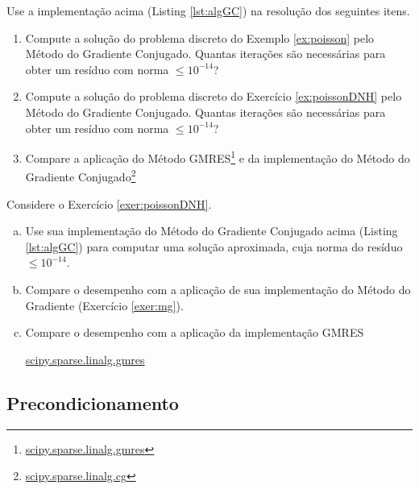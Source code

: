 \begin{exer}\label{exer:mgc}
  Use a implementação acima (Listing \ref{lst:algGC}) na resolução dos seguintes itens.
  \begin{enumerate}
  \item Compute a solução do problema discreto do Exemplo \ref{ex:poisson} pelo Método do Gradiente Conjugado. Quantas iterações são necessárias para obter um resíduo com norma $\leq 10^{-14}$?
  \item Compute a solução do problema discreto do Exercício \ref{ex:poissonDNH} pelo Método do Gradiente Conjugado. Quantas iterações são necessárias para obter um resíduo com norma $\leq 10^{-14}$?
  \item Compare a aplicação do Método GMRES\footnote{\href{https://docs.scipy.org/doc/scipy/reference/generated/scipy.sparse.linalg.gmres.html}{scipy.sparse.linalg.gmres}} e da implementação {\scipy} do Método do Gradiente Conjugado\footnote{\href{https://docs.scipy.org/doc/scipy/reference/generated/scipy.sparse.linalg.cg.html}{scipy.sparse.linalg.cg}}
  \end{enumerate}
\end{exer}

\begin{exer}
  Considere o Exercício \ref{exer:poissonDNH}.
  \begin{enumerate}[a)]
  \item Use sua implementação do Método do Gradiente Conjugado acima (Listing \ref{lst:algGC}) para computar uma solução aproximada, cuja norma do resíduo $\leq 10^{-14}$.
  \item Compare o desempenho com a aplicação de sua implementação do Método do Gradiente (Exercício \ref{exer:mg}).
  \item Compare o desempenho com a aplicação da implementação GMRES
    \begin{center}
      \href{https://docs.scipy.org/doc/scipy/reference/generated/scipy.sparse.linalg.gmres.html}{scipy.sparse.linalg.gmres}
    \end{center}
  \end{enumerate}
\end{exer}

\subsection{Precondicionamento}

\emconstrucao